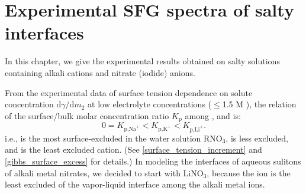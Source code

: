 \chapter{Experimental SFG spectra of salty interfaces}\label{CHAPTER_SFG_Exp}
In this chapter, we give the experimental results obtained on salty solutions containing alkali cations and nitrate (iodide) anions. \cite{PS03,AJ12,HuaWei2014} 

From the experimental data of surface tension dependence on solute concentration $\text{d}\gamma/\text{d}m_2$ 
at low electrolyte concentrations ($\leq$1.5 M ), \cite{Weissenborn95,Hey81,Jarvis68,Jarvis72} 
the relation of the surface/bulk molar concentration ratio $K_{\text{p}}$ \cite{Pegram2006} among \li, \Na and \K is: 
\begin{equation}
0=K_{\text{p,Na}^+}< K_{\text{p,K}^+}< K_{\text{p,Li}^+}.
\label{eq:bscr}
\end{equation}
i.e., \Na is the most surface-excluded in the water solution RNO$_3$, \K is less excluded, 
and \Li is the least excluded cation. (See \ref{surface_tension_increment} and \ref{gibbs_surface_excess} for details.)
In modeling the interfaces of aqueous sulitons of alkali metal nitrates, we decided to start with LiNO$_3$, because the \Li ion is the least excluded of the vapor-liquid interface 
among the alkali metal ions. 
%
%

